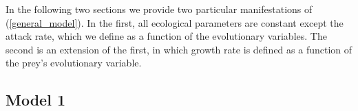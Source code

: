 \documentclass{amsart}
\theoremstyle{definition}
\theoremstyle{remark}
\numberwithin{equation}{section}
\begin{document}
In the following two sections we provide two particular manifestations of (\ref{general_model}).  In the first, all ecological parameters are constant except the attack rate, which we define as a function of the evolutionary variables.  The second is an extension of the first, in which growth rate is defined as a function of the prey's evolutionary variable.



















\subsection{Model 1}
\end{document}
